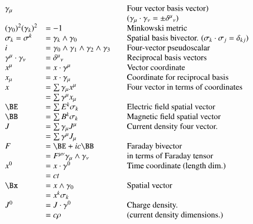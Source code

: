 \documentclass{article}
\begin{document}
\begin{equation*}\label{eqn:notation}
\begin{array}{l l l}
\gamma_{\mu} & & \quad \mbox{Four vector basis vector)} \\
& & \quad \mbox{($\gamma_{\mu} \cdot \gamma_{\nu} = \pm {\delta^{\mu}}_{\nu}$)} \\
{(\gamma_0)}^2 {(\gamma_k)}^2 &= -1 & \quad \mbox{Minkowski metric} \\
\sigma_k = \sigma^k &= \gamma_{k} \wedge \gamma_0 & \quad \mbox{Spatial basis bivector. ($\sigma_k \cdot \sigma_j = \delta_{kj}$)} \\
i &= \gamma_{0} \wedge \gamma_1 \wedge \gamma_{2} \wedge \gamma_3 & \quad \mbox{Four-vector pseudoscalar} \\
\gamma^{\mu} \cdot \gamma_{\nu} &= {\delta^{\mu}}_{\nu} & \quad \mbox{Reciprocal basis vectors} \\
x^{\mu} &= x \cdot \gamma^{\mu} & \quad \mbox{Vector coordinate} \\
x_{\mu} &= x \cdot \gamma_{\mu} & \quad \mbox{Coordinate for reciprocal basis} \\
x &= \sum \gamma_{\mu} x^{\mu} & \quad \mbox{Four vector in terms of coordinates} \\
  &= \sum \gamma^{\mu} x_{\mu} \\
\BE &= \sum E^k \sigma_k & \quad \mbox{Electric field spatial vector} \\
\BB &= \sum B^k \sigma_k & \quad \mbox{Magnetic field spatial vector} \\
J &= \sum \gamma_{\mu} J^{\mu} & \quad \mbox{Current density four vector.} \\
  &= \sum \gamma^{\mu} J_{\mu} \\
F &= \BE + i c \BB & \quad \mbox{Faraday bivector} \\
  &= F^{\mu\nu} \gamma_\mu \wedge \gamma_\nu & \quad \mbox{in terms of Faraday tensor} \\
x^{0} &= x \cdot \gamma^0 & \quad \mbox{Time coordinate (length dim.)} \\
      &= c t \\
\Bx &= x \wedge \gamma_0 & \quad \mbox{Spatial vector} \\
    &= x^k \sigma_k \\
J^{0} &= J \cdot \gamma^0 & \quad \mbox{Charge density.} \\
      &= c \rho & \quad \mbox{(current density dimensions.)} \\

\end{array}
\end{equation*}
\end{document}
